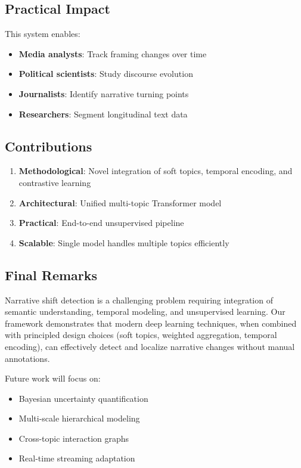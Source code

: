 \documentclass[12pt]{article}
\begin{document}
\subsection{Practical Impact}

This system enables:
\begin{itemize}
    \item \textbf{Media analysts}: Track framing changes over time
    \item \textbf{Political scientists}: Study discourse evolution
    \item \textbf{Journalists}: Identify narrative turning points
    \item \textbf{Researchers}: Segment longitudinal text data
\end{itemize}

\subsection{Contributions}

\begin{enumerate}
    \item \textbf{Methodological}: Novel integration of soft topics, temporal encoding, and contrastive learning
    \item \textbf{Architectural}: Unified multi-topic Transformer model
    \item \textbf{Practical}: End-to-end unsupervised pipeline
    \item \textbf{Scalable}: Single model handles multiple topics efficiently
\end{enumerate}

\subsection{Final Remarks}

Narrative shift detection is a challenging problem requiring integration of semantic understanding, temporal modeling, and unsupervised learning. Our framework demonstrates that modern deep learning techniques, when combined with principled design choices (soft topics, weighted aggregation, temporal encoding), can effectively detect and localize narrative changes without manual annotations.

Future work will focus on:
\begin{itemize}
    \item Bayesian uncertainty quantification
    \item Multi-scale hierarchical modeling
    \item Cross-topic interaction graphs
    \item Real-time streaming adaptation
\end{itemize}
\end{document}

